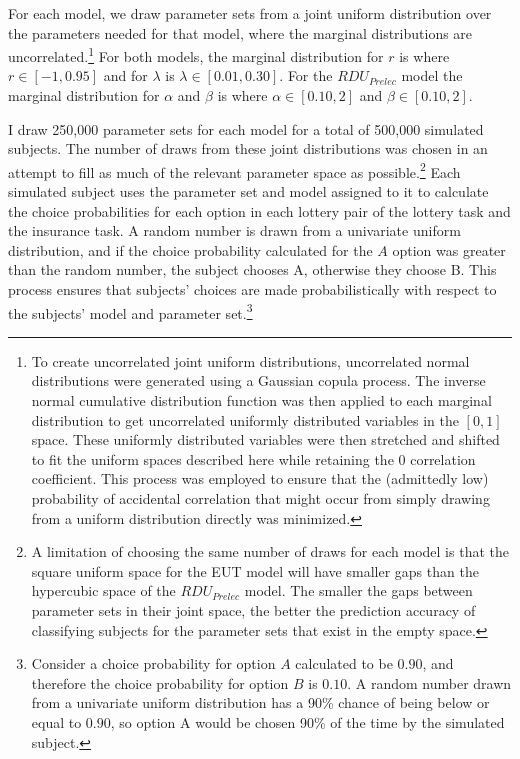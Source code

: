 \documentclass[../main.tex]{subfiles}
\begin{document}
For each model, we draw parameter sets from a joint uniform distribution over the parameters needed for that model, where the marginal distributions are uncorrelated.\footnote{
	To create uncorrelated joint uniform distributions, uncorrelated normal distributions were generated using a Gaussian copula process.
	The inverse normal cumulative distribution function was then applied to each marginal distribution to get uncorrelated uniformly distributed variables in the $[0,1]$ space.
	These uniformly distributed variables were then stretched and shifted to fit the uniform spaces described here while retaining the 0 correlation coefficient.
	This process was employed to ensure that the (admittedly low) probability of accidental correlation that might occur from simply drawing from a uniform distribution directly was minimized.
}
For both models, the marginal distribution for $r$ is where $r \in [-1, 0.95]$ and  for $\lambda$ is $\lambda \in [0.01, 0.30]$.
For the $\mathit{RDU_{Prelec}}$ model the marginal distribution for $\alpha$ and $\beta$ is where $\alpha \in [0.10, 2]$ and $\beta \in [0.10, 2]$.

I draw 250,000 parameter sets for each model for a total of 500,000 simulated subjects.
The number of draws from these joint distributions was chosen in an attempt to fill as much of the relevant parameter space as possible.\footnote{
	A limitation of choosing the same number of draws for each model is that the square uniform space for the EUT model will have smaller gaps than the hypercubic space of the $\mathit{RDU_{Prelec}}$ model.
	The smaller the gaps between parameter sets in their joint space, the better the prediction accuracy of classifying subjects for the parameter sets that exist in the empty space.
}
Each simulated subject uses the parameter set and model assigned to it to calculate the choice probabilities for each option in each lottery pair of the lottery task and the insurance task.
A random number is drawn from a univariate uniform distribution, and if the choice probability calculated for the $A$ option was greater than the random number, the subject chooses A, otherwise they choose B.
This process ensures that subjects' choices are made probabilistically with respect to the subjects' model and parameter set.\footnote{
	Consider a choice probability for option $A$ calculated to be $0.90$, and therefore the choice probability for option $B$ is $0.10$.
	A random number drawn from a univariate uniform distribution has a 90\% chance of being below or equal to $0.90$, so option A would be chosen 90\% of the time by the simulated subject.
} 
\end{document}
